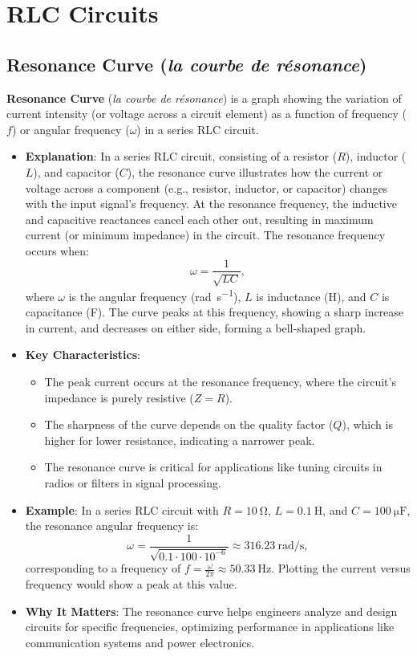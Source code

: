 \documentclass[12pt]{article}
\newcommand{\concept}[1]{\textbf{#1}}
\begin{document}
\section{RLC Circuits}
\subsection{Resonance Curve (\textit{la courbe de résonance})}
\concept{Resonance Curve} (\textit{la courbe de résonance}) is a graph showing the variation of current intensity (or voltage across a circuit element) as a function of frequency (\(f\)) or angular frequency (\(\omega\)) in a series RLC circuit.
\begin{itemize}
    \item \textbf{Explanation}: In a series RLC circuit, consisting of a resistor (\(R\)), inductor (\(L\)), and capacitor (\(C\)), the resonance curve illustrates how the current or voltage across a component (e.g., resistor, inductor, or capacitor) changes with the input signal’s frequency. At the resonance frequency, the inductive and capacitive reactances cancel each other out, resulting in maximum current (or minimum impedance) in the circuit. The resonance frequency occurs when:
        \[
        \omega = \frac{1}{\sqrt{L C}},
        \]
        where \(\omega\) is the angular frequency (\si{\radian\per\second}), \(L\) is inductance (\si{\henry}), and \(C\) is capacitance (\si{\farad}). The curve peaks at this frequency, showing a sharp increase in current, and decreases on either side, forming a bell-shaped graph.
    \item \textbf{Key Characteristics}:
        \begin{itemize}
            \item The peak current occurs at the resonance frequency, where the circuit’s impedance is purely resistive (\(Z = R\)).
            \item The sharpness of the curve depends on the quality factor (\(Q\)), which is higher for lower resistance, indicating a narrower peak.
            \item The resonance curve is critical for applications like tuning circuits in radios or filters in signal processing.
        \end{itemize}
    \item \textbf{Example}: In a series RLC circuit with \(R = \SI{10}{\ohm}\), \(L = \SI{0.1}{\henry}\), and \(C = \SI{100}{\micro\farad}\), the resonance angular frequency is:
        \[
        \omega = \frac{1}{\sqrt{0.1 \cdot 100 \cdot 10^{-6}}} \approx \SI{316.23}{\radian\per\second},
        \]
        corresponding to a frequency of \(f = \frac{\omega}{2 \pi} \approx \SI{50.33}{\hertz}\). Plotting the current versus frequency would show a peak at this value.
    \item \textbf{Why It Matters}: The resonance curve helps engineers analyze and design circuits for specific frequencies, optimizing performance in applications like communication systems and power electronics.
\end{itemize}
\end{document}
